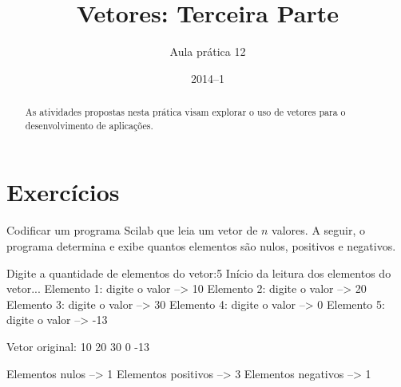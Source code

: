 \documentclass[11pt]{practice}
\begin{document}
\subtitle{Aula prática 12}
\title{Vetores: Terceira Parte}
\author{}
\date{2014--1}
\maketitle

\begin{abstract}
  As atividades propostas nesta prática visam explorar o uso de vetores
  para o desenvolvimento de aplicações.
\end{abstract}

\tableofcontents

\section{Exercícios}

\begin{task}[breakable]{}{}
  Codificar um programa Scilab que leia um vetor de $n$ valores. A
  seguir, o programa determina e exibe quantos elementos são nulos,
  positivos e negativos.
  \begin{runexample}
Digite a quantidade de elementos do vetor:5
Início da leitura dos elementos do vetor...
Elemento 1: 
  digite o valor --> 10
Elemento 2: 
  digite o valor --> 20
Elemento 3: 
  digite o valor --> 30
Elemento 4: 
  digite o valor --> 0
Elemento 5: 
  digite o valor --> -13

Vetor original:
10  20  30  0  -13  

Elementos nulos     --> 1
Elementos positivos --> 3
Elementos negativos --> 1
  \end{runexample}

  \tcblower
  \solution
\end{task}
\end{document}
